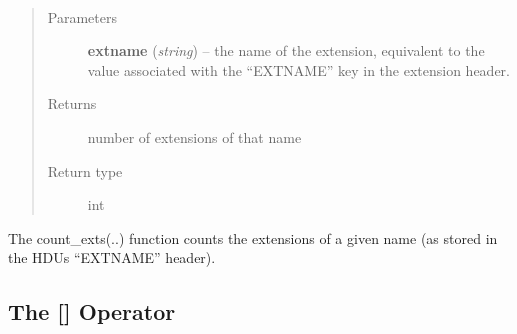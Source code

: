\documentclass[letterpaper,10pt,english]{sphinxmanual}
\begin{document}
\begin{fulllineitems}
\label{chapter_AstroDataClass:astrodata.data.AstroData.count_exts}~\begin{quote}\begin{description}
\item[{Parameters}] \leavevmode
\textbf{extname} (\emph{string}) -- the name of the extension, equivalent to the
value associated with the ``EXTNAME'' key in the extension 
header.

\item[{Returns}] \leavevmode
number of extensions of that name

\item[{Return type}] \leavevmode
int

\end{description}\end{quote}

The count\_exts(..) function counts the extensions of a given name
(as stored in the HDUs ``EXTNAME'' header).

\end{fulllineitems}



\subsection{The {[}{]} Operator}
\label{chapter_AstroDataClass:the-operator}
\end{document}
